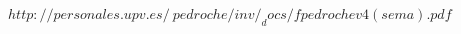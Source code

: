 \begin{thebibliography}{9}

  $http://personales.upv.es/~pedroche/inv/_docs/fpedrochev4(sema).pdf$

\end{thebibliography}